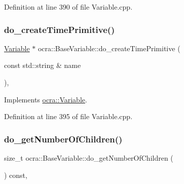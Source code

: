 Definition at line 390 of file Variable.\+cpp.

\hypertarget{classocra_1_1BaseVariable_ab010bd127ba34ff57168bf69182a78d5}{}\label{classocra_1_1BaseVariable_ab010bd127ba34ff57168bf69182a78d5} 
\subsubsection{\texorpdfstring{do\+\_\+create\+Time\+Primitive()}{do\_createTimePrimitive()}}
{\footnotesize\ttfamily \hyperlink{classocra_1_1Variable}{Variable} $\ast$ ocra\+::\+Base\+Variable\+::do\+\_\+create\+Time\+Primitive (\begin{DoxyParamCaption}\item[{const std\+::string \&}]{name }\end{DoxyParamCaption})\hspace{0.3cm}{\ttfamily [protected]}, {\ttfamily [virtual]}}



Implements \hyperlink{classocra_1_1Variable_ae37610cbde7630dcda3dd6e09e251057}{ocra\+::\+Variable}.



Definition at line 395 of file Variable.\+cpp.

\hypertarget{classocra_1_1BaseVariable_abf5dc1c3eaa689663cc09e06b8f5b3a1}{}\label{classocra_1_1BaseVariable_abf5dc1c3eaa689663cc09e06b8f5b3a1} 
\subsubsection{\texorpdfstring{do\+\_\+get\+Number\+Of\+Children()}{do\_getNumberOfChildren()}}
{\footnotesize\ttfamily size\+\_\+t ocra\+::\+Base\+Variable\+::do\+\_\+get\+Number\+Of\+Children (\begin{DoxyParamCaption}{ }\end{DoxyParamCaption}) const\hspace{0.3cm}{\ttfamily [protected]}, {\ttfamily [virtual]}}



